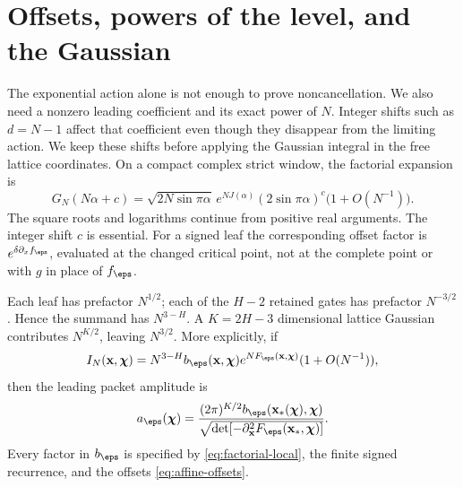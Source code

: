 \section{Offsets, powers of the level, and the Gaussian}

The exponential action alone is not enough to prove noncancellation. We also need a nonzero leading coefficient and its exact power of $N$. Integer shifts such as $d=N-1$ affect that coefficient even though they disappear from the limiting action. We keep these shifts before applying the Gaussian integral in the free lattice coordinates.
On a compact complex strict window, the factorial expansion is
\begin{equation}\label{eq:factorial-local}
 G_N(N\alpha+c)=\sqrt{2N\sin\pi\alpha}\,
 e^{NJ(\alpha)}(2\sin\pi\alpha)^c\bigl(1+O(N^{-1})\bigr).
\end{equation}
The square roots and logarithms continue from positive real arguments. The integer shift $c$ is essential. For a signed leaf the corresponding offset factor is $e^{\delta\partial_x f_\eps}$, evaluated at the changed critical point, not at the complete point or with $g$ in place of $f_\eps$.

Each leaf has prefactor $N^{1/2}$; each of the $H-2$ retained gates has prefactor $N^{-3/2}$. Hence the summand has $N^{3-H}$. A $K=2H-3$ dimensional lattice Gaussian contributes $N^{K/2}$, leaving $N^{3/2}$. More explicitly, if
\[
 I_N(\mathbf x,\boldsymbol\chi)
 =N^{3-H}b_\eps(\mathbf x,\boldsymbol\chi)
 e^{NF_\eps(\mathbf x,\boldsymbol\chi)}(1+O(N^{-1})),
\]
then the leading packet amplitude is
\begin{equation}\label{eq:packet-amplitude}
 a_\eps(\boldsymbol\chi)=
 \frac{(2\pi)^{K/2}b_\eps(\mathbf x_*(\boldsymbol\chi),\boldsymbol\chi)}
 {\sqrt{\det[-\partial^2_{\mathbf x}F_\eps(\mathbf x_*,\boldsymbol\chi)]}}.
\end{equation}
Every factor in $b_\eps$ is specified by \eqref{eq:factorial-local}, the finite signed recurrence, and the offsets \eqref{eq:affine-offsets}.

